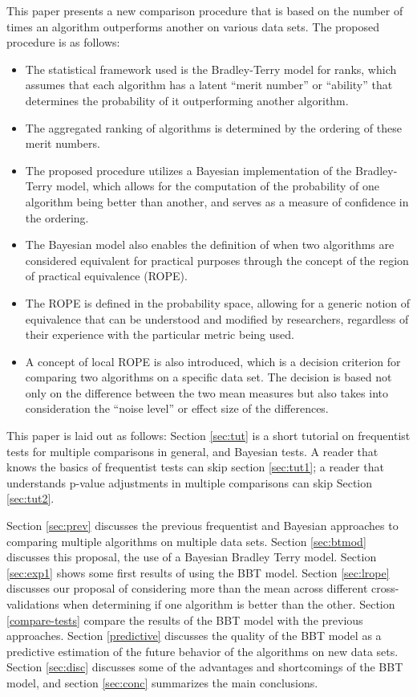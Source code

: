 \documentclass[twoside,11pt,preprint]{article}
\begin{document}
This paper presents a new comparison procedure that is based on the number of times an algorithm outperforms another on various data sets. The proposed procedure is as follows:

\begin{itemize}
\item
  The statistical framework used is the Bradley-Terry model for ranks, which assumes that each algorithm has a latent ``merit number'' or ``ability'' that determines the probability of it outperforming another algorithm.
\item
  The aggregated ranking of algorithms is determined by the ordering of these merit numbers.
\item
  The proposed procedure utilizes a Bayesian implementation of the Bradley-Terry model, which allows for the computation of the probability of one algorithm being better than another, and serves as a measure of confidence in the ordering.
\item
  The Bayesian model also enables the definition of when two algorithms are considered equivalent for practical purposes through the concept of the region of practical equivalence (ROPE).
\item
  The ROPE is defined in the probability space, allowing for a generic notion of equivalence that can be understood and modified by researchers, regardless of their experience with the particular metric being used.
\item
  A concept of local ROPE is also introduced, which is a decision criterion for comparing two algorithms on a specific data set. The decision is based not only on the difference between the two mean measures but also takes into consideration the ``noise level'' or effect size of the differences.
\end{itemize}

This paper is laid out as follows: Section \ref{sec:tut} is a short
tutorial on frequentist tests for multiple comparisons in general, and
Bayesian tests. A reader that knows the basics of frequentist tests can
skip section \ref{sec:tut1}; a reader that understands p-value
adjustments in multiple comparisons can skip Section \ref{sec:tut2}.

Section \ref{sec:prev}
discusses the previous frequentist and Bayesian approaches to
comparing multiple algorithms on multiple data sets.
Section \ref{sec:btmod} discusses this proposal, the use of a
Bayesian Bradley Terry model. Section \ref{sec:exp1} shows some first
results of using the BBT model. Section \ref{sec:lrope} discusses our
proposal of considering more than the mean across different
cross-validations when determining if one algorithm is better than the
other. Section \ref{compare-tests} compare the results of the BBT
model with the previous approaches. Section \ref{predictive} discusses
the quality of the BBT model as a predictive estimation of the future
behavior of the algorithms on new data sets. Section \ref{sec:disc}
discusses some of the advantages and shortcomings of the BBT model,
and section \ref{sec:conc} summarizes the main conclusions.
\end{document}

